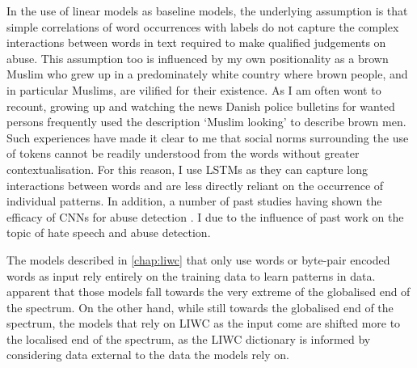 In the use of linear models as baseline models, the underlying assumption  is that simple correlations of word occurrences with labels do not capture the complex interactions between words in text required to make qualified judgements on abuse.
This assumption too is influenced by my own positionality as a brown Muslim who grew up in a predominately white country where brown people, and in particular Muslims, are vilified for their existence.
As I am often wont to recount, growing up and watching the news Danish police bulletins for wanted persons frequently used the description `Muslim looking' to describe brown men.
Such experiences have made it clear to me that social norms surrounding the use of tokens cannot be readily understood from the words  without greater contextualisation.
For this reason, I use LSTMs as they can capture long interactions between words and are less directly reliant on the occurrence of individual patterns.
In addition, a number of past studies having shown the efficacy of CNNs for abuse detection \citep{Park:2017, Mitchell:2019,Kolhatkar:2020,Rizwan:2020,Safaya:2020,Gamback:2017}.
I   due to the influence of past work on the topic of hate speech and abuse detection.

The models described in \autoref{chap:liwc} that only use words or byte-pair encoded words as input rely entirely on the training data to learn patterns in data.
 apparent that those models fall towards the very extreme of the globalised end of the  spectrum.
On the other hand, while still towards the globalised end of the spectrum, the models that rely on LIWC as the input come are shifted more to the localised end of the spectrum, as the LIWC dictionary  is informed by considering data external to the data the models rely on.



